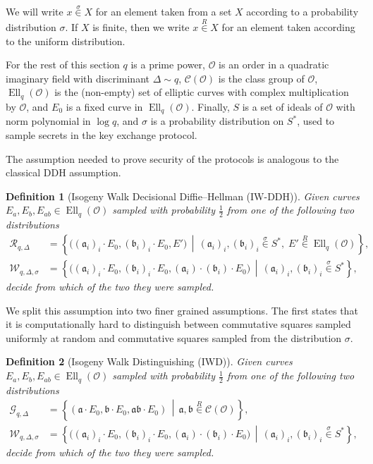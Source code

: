 \documentclass{article}
\newcommand{\Cl}{\mathcal{C}}
\renewcommand{\O}{\mathcal{O}}
\newcommand{\suchthat}{\,\middle\vert\,}
\renewcommand{\frak}{\mathfrak}
\newcommand{\rand}[1]{\overset{#1}{∈}}
\newcommand{\uni}{\rand{R}}
\newtheorem{definition}{Definition}[section]
\theoremstyle{definition}
\DeclareMathOperator{\Ell}{Ell}
\begin{document}
We will write $x\rand{σ} X$ for an element taken from a set $X$
according to a probability distribution $σ$. If $X$ is finite,
then we write $x\uni X$ for an element taken according to the uniform
distribution.

For the rest of this section $q$ is a prime power, $\O$ is an order in
a quadratic imaginary field with discriminant $Δ\sim q$, $\Cl(\O)$ is
the class group of $\O$, $\Ell_q(\O)$ is the (non-empty) set of
elliptic curves with complex multiplication by $\O$, and $E_0$ is a
fixed curve in $\Ell_q(\O)$. Finally, $S$ is a set of ideals of $\O$
with norm polynomial in $\log q$, and $σ$ is a probability
distribution on $S^*$, used to sample secrets in the key exchange
protocol.

The assumption needed to prove security of the protocols is analogous
to the classical DDH assumption.

\begin{definition}[Isogeny Walk Decisional Diffie--Hellman (IW-DDH)]
  Given curves $E_a,E_b,E_{ab}∈\Ell_q(\O)$ sampled with probability
  $\frac{1}{2}$ from one of the following two distributions
  \begin{align*}
    \mathcal{R}_{q,Δ} &= \left\{\bigl((\frak a_i)_i·E_0,(\frak b_i)_i·E_0,E'\bigr) \suchthat
                        (\frak a_i)_i,(\frak b_i)_i\rand{σ}S^*,\;
                        E'\uni\Ell_q(\O)\right\},\\
    \mathcal{W}_{q,Δ,σ} &= \left\{\bigl((\frak a_i)_i·E_0,(\frak b_i)_i·E_0,(\frak a_i)·(\frak b_i)·E_0\bigr) \suchthat
                          (\frak a_i)_i,(\frak b_i)_i\rand{σ}S^*\right\},
  \end{align*}
  decide from which of the two they were sampled.
\end{definition}

We split this assumption into two finer grained assumptions. The first
states that it is computationally hard to distinguish between
commutative squares sampled uniformly at random and commutative
squares sampled from the distribution $σ$.

\begin{definition}[Isogeny Walk Distinguishing (IWD)]
  Given curves $E_a,E_b,E_{ab}∈\Ell_q(\O)$ sampled with probability
  $\frac{1}{2}$ from one of the following two distributions
  \begin{align*}
    \mathcal{G}_{q,Δ} &= \left\{(\frak a·E_0,\frak b·E_0,\frak{ab}·E_0) \suchthat
                        \frak a,\frak b\uni\Cl(\O)\right\},\\
    \mathcal{W}_{q,Δ,σ} &= \left\{\bigl((\frak a_i)_i·E_0,(\frak b_i)_i·E_0,(\frak a_i)·(\frak b_i)·E_0\bigr) \suchthat
                          (\frak a_i)_i,(\frak b_i)_i\rand{σ}S^*\right\},
  \end{align*}
  decide from which of the two they were sampled.
\end{definition}
\end{document}
